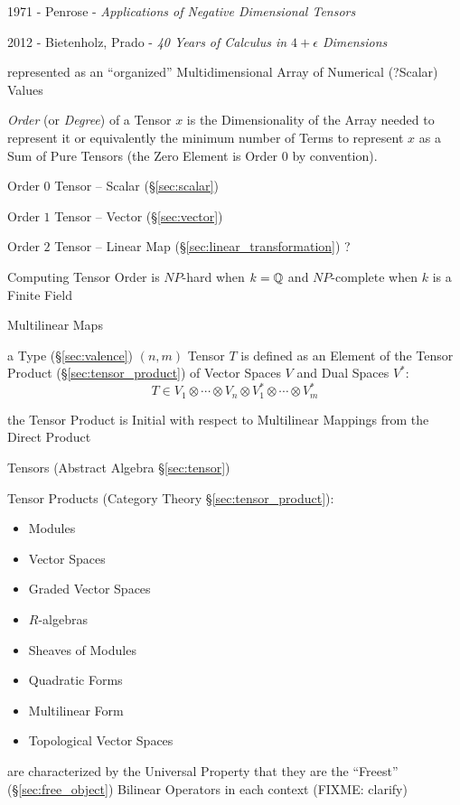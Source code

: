 1971 - Penrose - \emph{Applications of Negative Dimensional Tensors}

2012 - Bietenholz, Prado - \emph{40 Years of Calculus in $4 + \epsilon$
  Dimensions}


\asterism


represented as an ``organized'' Multidimensional Array of Numerical
(?Scalar) Values

\emph{Order} (or \emph{Degree}) of a Tensor $x$ is the
Dimensionality of the Array needed to represent it or equivalently the
minimum number of Terms to represent $x$ as a Sum of Pure Tensors (the
Zero Element is Order $0$ by convention).

Order $0$ Tensor -- Scalar (\S\ref{sec:scalar})

Order $1$ Tensor -- Vector (\S\ref{sec:vector})

Order $2$ Tensor -- Linear Map (\S\ref{sec:linear_transformation}) ?

Computing Tensor Order is $NP$-hard when $k = \mathbb{Q}$ and $NP$-complete
when $k$ is a Finite Field %


\asterism


Multilinear Maps


\asterism


a Type (\S\ref{sec:valence}) $(n,m)$ Tensor $T$ is defined as an
Element of the Tensor Product (\S\ref{sec:tensor_product}) of Vector
Spaces $V$ and Dual Spaces $V^*$:
\[
  T \in V_1 \otimes \cdots \otimes V_n
    \otimes V^*_1 \otimes \cdots \otimes V^*_m
\]

the Tensor Product is Initial with respect to Multilinear Mappings
from the Direct Product

Tensors (Abstract Algebra \S\ref{sec:tensor})

Tensor Products (Category Theory \S\ref{sec:tensor_product}):
\begin{itemize}
  \item Modules
  \item Vector Spaces
  \item Graded Vector Spaces
  \item $R$-algebras
  \item Sheaves of Modules
  \item Quadratic Forms
  \item Multilinear Form
  \item Topological Vector Spaces
\end{itemize}
are characterized by the Universal Property that they are the ``Freest''
(\S\ref{sec:free_object}) Bilinear Operators in each context
(FIXME: clarify)

